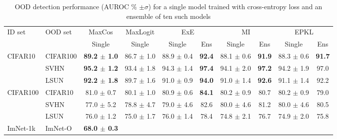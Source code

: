 \documentclass{article}
\begin{document}
\begin{table}[H]
  \begin{center}
  \caption{OOD detection performance (AUROC \% $\pm \sigma$) for a single model trained with cross-entropy loss and an ensemble of ten such models}
  \label{table:ood_performance}
  \begin{small}
  \begin{tabular}{ l l | c | c | c c | c c | c c }
    \toprule
    \multirow{2}{*}{ID set} & \multirow{2}{*}{OOD set} & \multicolumn{1}{c|}{MaxCos} & \multicolumn{1}{c|}{MaxLogit} & \multicolumn{2}{c|}{ExE} & \multicolumn{2}{c|}{MI} & \multicolumn{2}{c}{EPKL} \\
    & & Single & Single & Single & Ens & Single & Ens & Single & Ens \\
    \midrule
    \multirow{3}{*}{CIFAR10}
    & CIFAR100  & \bf{89.2} {\tiny $\pm$ 1.0}
                & 86.7 {\tiny $\pm$ 1.0}
                & 88.9 {\tiny $\pm$ 0.4} & \bf{92.4}
                & 88.1 {\tiny $\pm$ 0.6} & \bf{91.9}
                & 88.3 {\tiny $\pm$ 0.6} & \bf{91.7} \\
    & SVHN      & \bf{95.2} {\tiny $\pm$ 1.2}
                & 93.4 {\tiny $\pm$ 1.8}
                & 94.3 {\tiny $\pm$ 1.4} & \bf{97.4}
                & 94.1 {\tiny $\pm$ 2.0} & \bf{97.2}
                & 94.2 {\tiny $\pm$ 1.9} & 97.0 \\
    & LSUN      & \bf{92.2} {\tiny $\pm$ 1.8}
                & 89.7 {\tiny $\pm$ 1.6}
                & 91.0 {\tiny $\pm$ 0.9} & \bf{94.0}
                & 91.0 {\tiny $\pm$ 1.4} & \bf{92.6}
                & 91.1 {\tiny $\pm$ 1.4} & 92.2 \\
    \midrule
    \multirow{3}{*}{CIFAR100}
    & CIFAR10  & 81.0 {\tiny $\pm$ 0.7}
               & 80.1 {\tiny $\pm$ 1.0}
               & 80.9 {\tiny $\pm$ 0.6} & \bf{84.1}
               & 80.2 {\tiny $\pm$ 0.9} & 80.7
               & 80.2 {\tiny $\pm$ 0.9} & 79.0 \\
    & SVHN     & 77.0 {\tiny $\pm$ 5.2}
               & 78.8 {\tiny $\pm$ 4.7}
               & 79.0 {\tiny $\pm$ 4.6} & 82.6
               & 80.0 {\tiny $\pm$ 4.6} & 81.2
               & 80.0 {\tiny $\pm$ 4.6} & 80.5 \\
    & LSUN     & 76.0 {\tiny $\pm$ 1.2}
               & 75.0 {\tiny $\pm$ 1.7}
               & 76.0 {\tiny $\pm$ 1.4} & 78.4
               & 74.8 {\tiny $\pm$ 2.1} & 76.7
               & 74.9 {\tiny $\pm$ 2.0} & 75.8 \\
    \midrule
    \multirow{8}{*}{ImNet-1k}
    & ImNet-O    & \bf{68.0} {\tiny $\pm$ 0.3} %

\end{tabular}
\end{small}
\end{center}
\end{table}
\end{document}

